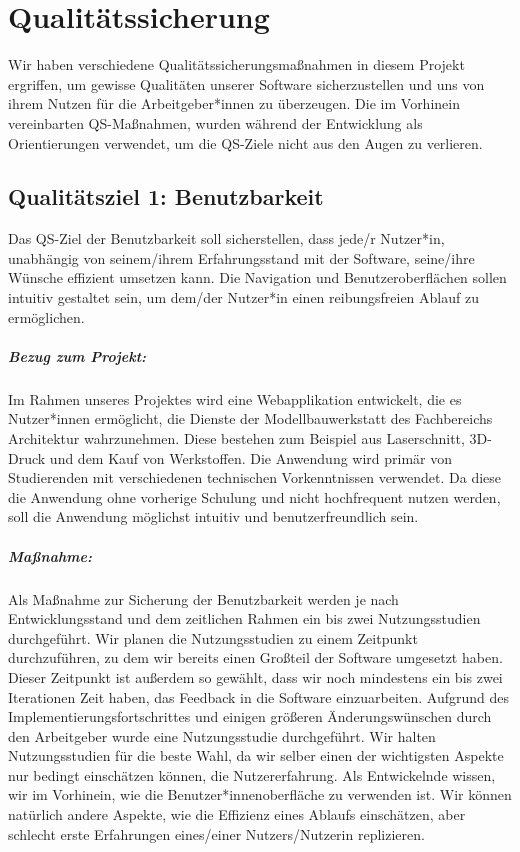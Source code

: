\documentclass[
ngerman,
accentcolor=2d,
marginpar=false,
class=report,
fontsize=11pt,
ruledheaders=section,
]{tudapub}
\begin{document}
	\chapter{Qualitätssicherung}
	    Wir haben verschiedene Qualitätssicherungsmaßnahmen in diesem Projekt ergriffen, um gewisse Qualitäten unserer Software
	    sicherzustellen und uns von ihrem Nutzen für die Arbeitgeber*innen zu überzeugen. Die im Vorhinein
	    vereinbarten QS-Maßnahmen, wurden während der Entwicklung als Orientierungen verwendet, um die QS-Ziele nicht
	    aus den Augen zu verlieren.

		\section{Qualitätsziel 1: Benutzbarkeit}
		    Das QS-Ziel der Benutzbarkeit soll sicherstellen, dass jede/r Nutzer*in, unabhängig von seinem/ihrem Erfahrungsstand mit der Software, seine/ihre Wünsche
		    effizient umsetzen kann. Die Navigation und Benutzeroberflächen sollen intuitiv gestaltet sein, um dem/der Nutzer*in einen reibungsfreien Ablauf zu ermöglichen.

		    \paragraph{Bezug zum Projekt:}
		    Im Rahmen unseres Projektes wird eine Webapplikation entwickelt, die es Nutzer*innen ermöglicht, die Dienste der Modellbauwerkstatt des Fachbereichs Architektur wahrzunehmen. Diese bestehen zum Beispiel aus Laserschnitt, 3D-Druck und dem Kauf von Werkstoffen. Die Anwendung wird primär von Studierenden mit verschiedenen technischen Vorkenntnissen verwendet. Da diese die Anwendung ohne vorherige Schulung und nicht hochfrequent nutzen werden, soll die Anwendung möglichst intuitiv und benutzerfreundlich sein.

		    \paragraph{Maßnahme:}
		    Als Maßnahme zur Sicherung der Benutzbarkeit werden je nach Entwicklungsstand und dem zeitlichen Rahmen ein bis zwei Nutzungsstudien durchgeführt. Wir planen die Nutzungsstudien zu einem Zeitpunkt durchzuführen, zu dem wir bereits einen Großteil der Software umgesetzt haben. Dieser Zeitpunkt ist außerdem so gewählt, dass wir noch mindestens ein bis zwei Iterationen Zeit haben, das Feedback in die Software einzuarbeiten. Aufgrund des Implementierungsfortschrittes und einigen größeren Änderungswünschen durch den Arbeitgeber wurde eine Nutzungsstudie durchgeführt.
		    Wir halten Nutzungsstudien für die beste Wahl, da wir selber einen der wichtigsten Aspekte nur bedingt einschätzen können, die Nutzererfahrung.
		    Als Entwickelnde wissen, wir im Vorhinein, wie die Benutzer*innenoberfläche zu verwenden ist. Wir können natürlich andere Aspekte, wie die Effizienz eines
		    Ablaufs einschätzen, aber schlecht erste Erfahrungen eines/einer Nutzers/Nutzerin replizieren.
\end{document}
